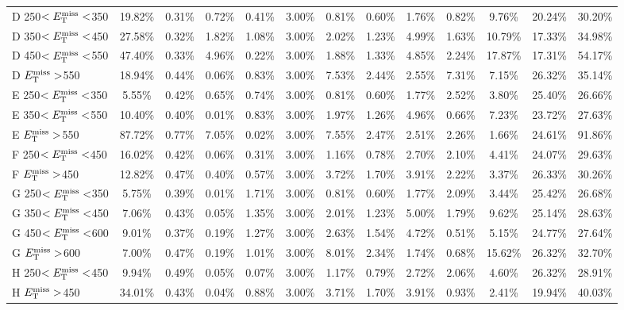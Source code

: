 \begin{table}
\begin{tabular}{|l|cccccccccccc|}
 D 250$<E_\text{T}^\text{miss}<$350 & 19.82\% & 0.31\%  & 0.72\%  & 0.41\%  & 3.00\%  & 0.81\%  & 0.60\%  & 1.76\%  & 0.82\%  & 9.76\%  & 20.24\% & 30.20\% \\
 D 350$<E_\text{T}^\text{miss}<$450 & 27.58\% & 0.32\%  & 1.82\%  & 1.08\%  & 3.00\%  & 2.02\%  & 1.23\%  & 4.99\%  & 1.63\%  & 10.79\% & 17.33\% & 34.98\% \\
 D 450$<E_\text{T}^\text{miss}<$550 & 47.40\% & 0.33\%  & 4.96\%  & 0.22\%  & 3.00\%  & 1.88\%  & 1.33\%  & 4.85\%  & 2.24\%  & 17.87\% & 17.31\% & 54.17\% \\
 D $E_\text{T}^\text{miss}>$550     & 18.94\% & 0.44\%  & 0.06\%  & 0.83\%  & 3.00\%  & 7.53\%  & 2.44\%  & 2.55\%  & 7.31\%  & 7.15\%  & 26.32\% & 35.14\% \\
 E 250$<E_\text{T}^\text{miss}<$350 & 5.55\%  & 0.42\%  & 0.65\%  & 0.74\%  & 3.00\%  & 0.81\%  & 0.60\%  & 1.77\%  & 2.52\%  & 3.80\%  & 25.40\% & 26.66\% \\
 E 350$<E_\text{T}^\text{miss}<$550 & 10.40\% & 0.40\%  & 0.01\%  & 0.83\%  & 3.00\%  & 1.97\%  & 1.26\%  & 4.96\%  & 0.66\%  & 7.23\%  & 23.72\% & 27.63\% \\
 E $E_\text{T}^\text{miss}>$550     & 87.72\% & 0.77\%  & 7.05\%  & 0.02\%  & 3.00\%  & 7.55\%  & 2.47\%  & 2.51\%  & 2.26\%  & 1.66\%  & 24.61\% & 91.86\% \\
 F 250$<E_\text{T}^\text{miss}<$450 & 16.02\% & 0.42\%  & 0.06\%  & 0.31\%  & 3.00\%  & 1.16\%  & 0.78\%  & 2.70\%  & 2.10\%  & 4.41\%  & 24.07\% & 29.63\% \\
 F $E_\text{T}^\text{miss}>$450     & 12.82\% & 0.47\%  & 0.40\%  & 0.57\%  & 3.00\%  & 3.72\%  & 1.70\%  & 3.91\%  & 2.22\%  & 3.37\%  & 26.33\% & 30.26\% \\
 G 250$<E_\text{T}^\text{miss}<$350 & 5.75\%  & 0.39\%  & 0.01\%  & 1.71\%  & 3.00\%  & 0.81\%  & 0.60\%  & 1.77\%  & 2.09\%  & 3.44\%  & 25.42\% & 26.68\% \\
 G 350$<E_\text{T}^\text{miss}<$450 & 7.06\%  & 0.43\%  & 0.05\%  & 1.35\%  & 3.00\%  & 2.01\%  & 1.23\%  & 5.00\%  & 1.79\%  & 9.62\%  & 25.14\% & 28.63\% \\
 G 450$<E_\text{T}^\text{miss}<$600 & 9.01\%  & 0.37\%  & 0.19\%  & 1.27\%  & 3.00\%  & 2.63\%  & 1.54\%  & 4.72\%  & 0.51\%  & 5.15\%  & 24.77\% & 27.64\% \\
 G $E_\text{T}^\text{miss}>$600     & 7.00\%  & 0.47\%  & 0.19\%  & 1.01\%  & 3.00\%  & 8.01\%  & 2.34\%  & 1.74\%  & 0.68\%  & 15.62\% & 26.32\% & 32.70\% \\
 H 250$<E_\text{T}^\text{miss}<$450 & 9.94\%  & 0.49\%  & 0.05\%  & 0.07\%  & 3.00\%  & 1.17\%  & 0.79\%  & 2.72\%  & 2.06\%  & 4.60\%  & 26.32\% & 28.91\% \\
 H $E_\text{T}^\text{miss}>$450     & 34.01\% & 0.43\%  & 0.04\%  & 0.88\%  & 3.00\%  & 3.71\%  & 1.70\%  & 3.91\%  & 0.93\%  & 2.41\%  & 19.94\% & 40.03\% \\

\end{tabular}
\end{table}
